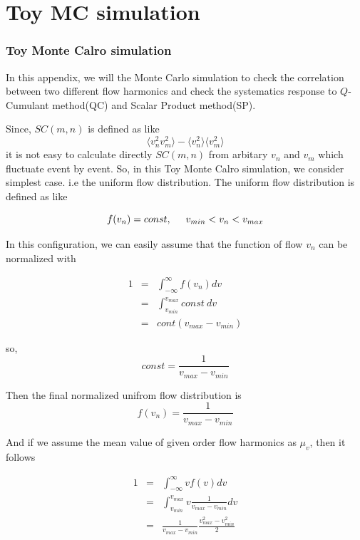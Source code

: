 
\chapter{Toy MC simulation}

\subsection{Toy Monte Calro simulation}
In this appendix, we will the Monte Carlo simulation to check the correlation between two different flow harmonics and check the systematics response to $Q$-Cumulant method(QC) and Scalar Product method(SP). 

\smallskip	
	
	Since, $SC(m,n)$ is defined as like $$ \langle v_n^2 v_m^2 \rangle - \langle v_n^2 \rangle \langle v_m^2 \rangle $$
	it is not easy to calculate directly $SC(m,n)$ from arbitary $v_n$ and $v_m$ which fluctuate event by event. So, in this Toy Monte Calro simulation, we consider simplest case. i.e the uniform flow distribution.
	The uniform flow distribution is defined as like
	
	\begin{equation}
		f(v_n) = const, \hskip5mm v_{min} < v_n < v_{max}
	\end{equation}
	
	In this configuration, we can easily assume that the function of flow $v_n$ can be normalized with
	
	\begin{eqnarray}
		1 &=& \int_{-\infty}^{\infty}f(v_n)dv \\
			&=& \int_{v_{min}}^{v_{max}}const ~ dv \\
			&=& cont (v_{max} - v_{min} )
	\end{eqnarray}
	
	
	so,
	\begin{equation}
		const = \frac{1}{v_{max} - v_{min} }
	\end{equation}
	\smallskip
	
	Then the final normalized unifrom flow distribution is
	\begin{equation}
		f(v_n) = \frac{1}{v_{max} - v_{min}}
	\end{equation}
	\smallskip
	
	And if we assume the mean value of given order flow harmonics as $\mu_v$, then it follows
		
		
	\begin{eqnarray}
		1 &=& \int_{-\infty}^{\infty}vf(v)dv \\
			&=& \int_{v_{min}}^{v_{max}} v \frac{1}{v_{max} - v_{min}}  dv \\
			&=& \frac{1}{v_{max} - v_{min}} \frac{v_{max}^2 - v_{min}^2}{2}
	\end{eqnarray}

